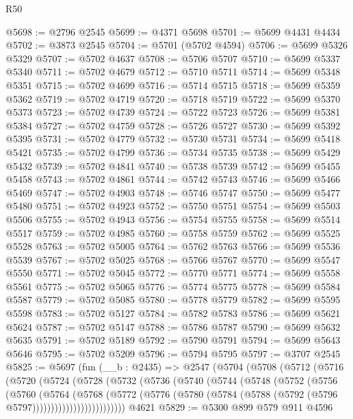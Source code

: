 \begin{lexlean}{R50}
\begin{coremodule}
@5698 := @2796 @2545
@5699 := @4371 @5698
@5701 := @5699 @4431 @4434
@5702 := @3873 @2545
@5704 := @5701 (@5702 @4594)
@5706 := @5699 @5326 @5329
@5707 := @5702 @4637
@5708 := @5706 @5707
@5710 := @5699 @5337 @5340
@5711 := @5702 @4679
@5712 := @5710 @5711
@5714 := @5699 @5348 @5351
@5715 := @5702 @4699
@5716 := @5714 @5715
@5718 := @5699 @5359 @5362
@5719 := @5702 @4719
@5720 := @5718 @5719
@5722 := @5699 @5370 @5373
@5723 := @5702 @4739
@5724 := @5722 @5723
@5726 := @5699 @5381 @5384
@5727 := @5702 @4759
@5728 := @5726 @5727
@5730 := @5699 @5392 @5395
@5731 := @5702 @4779
@5732 := @5730 @5731
@5734 := @5699 @5418 @5421
@5735 := @5702 @4799
@5736 := @5734 @5735
@5738 := @5699 @5429 @5432
@5739 := @5702 @4841
@5740 := @5738 @5739
@5742 := @5699 @5455 @5458
@5743 := @5702 @4861
@5744 := @5742 @5743
@5746 := @5699 @5466 @5469
@5747 := @5702 @4903
@5748 := @5746 @5747
@5750 := @5699 @5477 @5480
@5751 := @5702 @4923
@5752 := @5750 @5751
@5754 := @5699 @5503 @5506
@5755 := @5702 @4943
@5756 := @5754 @5755
@5758 := @5699 @5514 @5517
@5759 := @5702 @4985
@5760 := @5758 @5759
@5762 := @5699 @5525 @5528
@5763 := @5702 @5005
@5764 := @5762 @5763
@5766 := @5699 @5536 @5539
@5767 := @5702 @5025
@5768 := @5766 @5767
@5770 := @5699 @5547 @5550
@5771 := @5702 @5045
@5772 := @5770 @5771
@5774 := @5699 @5558 @5561
@5775 := @5702 @5065
@5776 := @5774 @5775
@5778 := @5699 @5584 @5587
@5779 := @5702 @5085
@5780 := @5778 @5779
@5782 := @5699 @5595 @5598
@5783 := @5702 @5127
@5784 := @5782 @5783
@5786 := @5699 @5621 @5624
@5787 := @5702 @5147
@5788 := @5786 @5787
@5790 := @5699 @5632 @5635
@5791 := @5702 @5189
@5792 := @5790 @5791
@5794 := @5699 @5643 @5646
@5795 := @5702 @5209
@5796 := @5794 @5795
@5797 := @3707 @2545
@5825 := @5697
    (fun (__b : @2435) =>
    @2547
      (@5704
        (@5708
          (@5712
            (@5716
              (@5720
                (@5724
                  (@5728
                    (@5732
                      (@5736
                        (@5740
                          (@5744
                            (@5748
                              (@5752
                                (@5756
                                  (@5760
                                    (@5764
                                      (@5768
                                        (@5772
                                          (@5776
                                            (@5780
                                              (@5784
                                                (@5788 (@5792 (@5796 @5797)))))))))))))))))))))))))
    @4621
@5829 := @5300 @899 @579 @911 @4596

\end{coremodule}
\end{lexlean}
